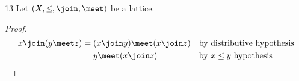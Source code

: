 \begin{theorem}
\label{def:lat_dis=>mod}
\citep{burris}{13}
Let $(X,\le,\join,\meet)$ be a lattice.
\end{theorem}
\begin{proof}
\begin{align*}
  x \join (y\meet z)
    &= (x\join y) \meet (x\join z)
    && \text{by distributive hypothesis}
  \\&= y \meet (x\join z)
    && \text{by $x\le y$ hypothesis}
\end{align*}
\end{proof}














